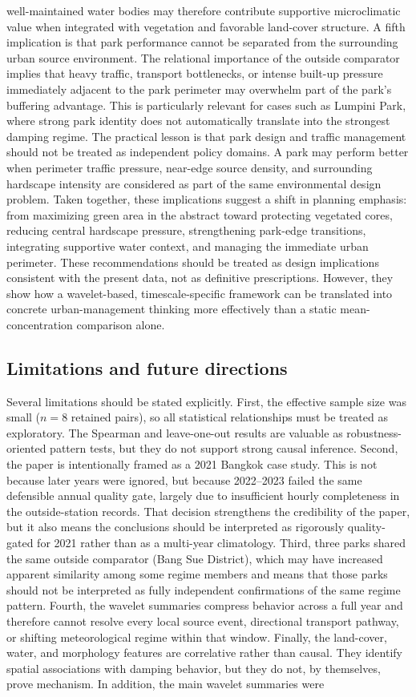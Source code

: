 well-maintained water bodies may therefore contribute supportive microclimatic value when integrated with vegetation and favorable land-cover structure. A fifth implication is that park performance cannot be separated from the surrounding urban source environment. The relational importance of the outside comparator implies that heavy traffic, transport bottlenecks, or intense built-up pressure immediately adjacent to the park perimeter may overwhelm part of the park's buffering advantage. This is particularly relevant for cases such as Lumpini Park, where strong park identity does not automatically translate into the strongest damping regime. The practical lesson is that park design and traffic management should not be treated as independent policy domains. A park may perform better when perimeter traffic pressure, near-edge source density, and surrounding hardscape intensity are considered as part of the same environmental design problem. Taken together, these implications suggest a shift in planning emphasis: from maximizing green area in the abstract toward protecting vegetated cores, reducing central hardscape pressure, strengthening park-edge transitions, integrating supportive water context, and managing the immediate urban perimeter. These recommendations should be treated as design implications consistent with the present data, not as definitive prescriptions. However, they show how a wavelet-based, timescale-specific framework can be translated into concrete urban-management thinking more effectively than a static mean-concentration comparison alone. \subsection{Limitations and future directions} Several limitations should be stated explicitly. First, the effective sample size was small ($n = 8$ retained pairs), so all statistical relationships must be treated as exploratory. The Spearman and leave-one-out results are valuable as robustness-oriented pattern tests, but they do not support strong causal inference. Second, the paper is intentionally framed as a 2021 Bangkok case study. This is not because later years were ignored, but because 2022--2023 failed the same defensible annual quality gate, largely due to insufficient hourly completeness in the outside-station records. That decision strengthens the credibility of the paper, but it also means the conclusions should be interpreted as rigorously quality-gated for 2021 rather than as a multi-year climatology. Third, three parks shared the same outside comparator (Bang Sue District), which may have increased apparent similarity among some regime members and means that those parks should not be interpreted as fully independent confirmations of the same regime pattern. Fourth, the wavelet summaries compress behavior across a full year and therefore cannot resolve every local source event, directional transport pathway, or shifting meteorological regime within that window. Finally, the land-cover, water, and morphology features are correlative rather than causal. They identify spatial associations with damping behavior, but they do not, by themselves, prove mechanism. In addition, the main wavelet summaries were 